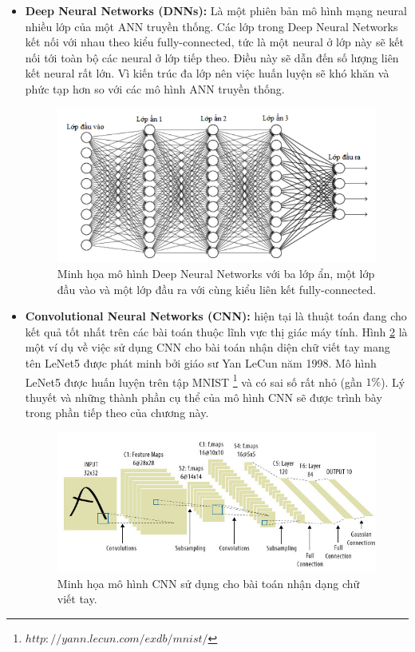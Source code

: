 \begin{itemize}
	\item \textbf{Deep Neural Networks (DNNs):} Là một phiên bản mô hình mạng neural nhiều lớp của một ANN truyền thống. Các lớp trong Deep Neural Networks kết nối với nhau theo kiểu fully-connected, tức là một neural ở lớp này sẽ kết nối tới toàn bộ các neural ở lớp tiếp theo. Điều này sẽ dẫn đến số lượng liên kết neural rất lớn. Vì kiến trúc đa lớp nên việc huấn luyện sẽ khó khăn và phức tạp hơn so với các mô hình ANN truyền thống. 
\begin{figure}[t]
  			\begin{center}
    				\includegraphics[scale=0.6]{ANNs}
    				\caption{Minh họa mô hình Deep Neural Networks với ba lớp ẩn, một lớp đầu vào và một lớp đầu ra với cùng kiểu liên kết fully-connected.} 
    				\label{ANNs}
  			\end{center}
\end{figure}	

	\item \textbf{Convolutional Neural Networks (CNN):} hiện tại là thuật toán đang cho kết quả tốt nhất trên các bài toán thuộc lĩnh vực thị giác máy tính. Hình \ref{CNN_chu} là một ví dụ về việc sử dụng CNN cho bài toán nhận diện chữ viết tay mang tên LeNet5 được phát minh bởi giáo sư Yan LeCun năm 1998. Mô hình LeNet5 được huấn luyện trên tập MNIST \footnote{$http://yann.lecun.com/exdb/mnist/$} và có sai số rất nhỏ (gần $1\%$). Lý thuyết và những thành phần cụ thể của mô hình CNN sẽ được trình bày trong phần tiếp theo của chương này. 
	
\begin{figure}[t]
  			\begin{center}
    				\includegraphics[scale=0.6]{CNN_chu}
    				\caption{Minh họa mô hình CNN sử dụng cho bài toán nhận dạng chữ viết tay.} 
    				\label{CNN_chu}
  			\end{center}
\end{figure}	

\end{itemize}	  
	 

